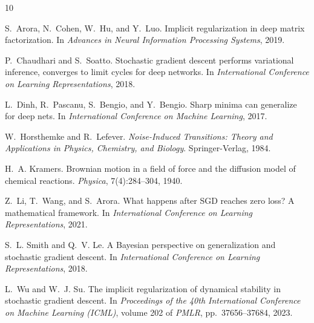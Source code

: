 \documentclass[11pt,a4paper]{article}
\begin{document}
\begin{thebibliography}{10}

S.~Arora, N.~Cohen, W.~Hu, and Y.~Luo.
\newblock Implicit regularization in deep matrix factorization.
\newblock In \emph{Advances in Neural Information Processing Systems}, 2019.

P.~Chaudhari and S.~Soatto.
\newblock Stochastic gradient descent performs variational inference, converges
  to limit cycles for deep networks.
\newblock In \emph{International Conference on Learning Representations}, 2018.

L.~Dinh, R.~Pascanu, S.~Bengio, and Y.~Bengio.
\newblock Sharp minima can generalize for deep nets.
\newblock In \emph{International Conference on Machine Learning}, 2017.

W.~Horsthemke and R.~Lefever.
\newblock \emph{Noise-Induced Transitions: Theory and Applications in Physics,
  Chemistry, and Biology}.
\newblock Springer-Verlag, 1984.

H.~A. Kramers.
\newblock Brownian motion in a field of force and the diffusion model of
  chemical reactions.
\newblock \emph{Physica}, 7(4):284--304, 1940.

Z.~Li, T.~Wang, and S.~Arora.
\newblock What happens after {SGD} reaches zero loss? {A} mathematical
  framework.
\newblock In \emph{International Conference on Learning Representations}, 2021.

S.~L. Smith and Q.~V. Le.
\newblock A {B}ayesian perspective on generalization and stochastic gradient
  descent.
\newblock In \emph{International Conference on Learning Representations}, 2018.

L.~Wu and W.~J. Su.
\newblock The implicit regularization of dynamical stability in stochastic
  gradient descent.
\newblock In \emph{Proceedings of the 40th International Conference on Machine
  Learning (ICML)}, volume 202 of \emph{PMLR}, pp.\ 37656--37684, 2023.

\end{thebibliography}
\end{document}
